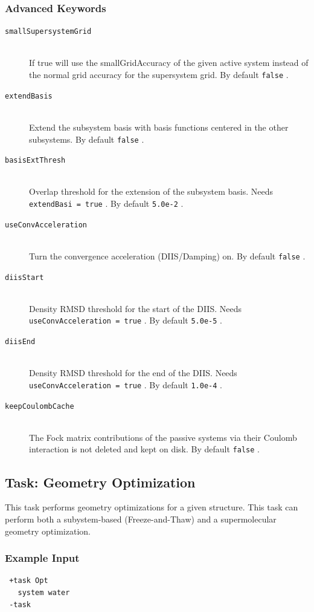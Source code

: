 \documentclass[bibliography=totocnumbered,a4paper,10pt,oneside]{scrbook}
\newcommand{\ttt}[1]{%
  \begingroup\setlength{\fboxsep}{1pt}%
  \colorbox{serenity-green!30}{\texttt{\hspace*{2pt}\vphantom{(g}#1\hspace*{2pt}}}%
  \endgroup
}
\begin{document}
\subsubsection{Advanced Keywords}
\begin{description}
	\item [\texttt{smallSupersystemGrid}]\hfill \\
	If true will use the smallGridAccuracy of the given active system instead of the normal grid accuracy for the supersystem grid. By default \ttt{false}.
	\item [\texttt{extendBasis}]\hfill \\
	Extend the subsystem basis with basis functions centered in the other subsystems. By default \ttt{false}.
	\item [\texttt{basisExtThresh}]\hfill \\
	Overlap threshold for the extension of the subsystem basis. Needs \ttt{extendBasi = true}. By default \ttt{5.0e-2}.
	\item [\texttt{useConvAcceleration}]\hfill \\
	Turn the convergence acceleration (DIIS/Damping) on. By default \ttt{false}.
	\item [\texttt{diisStart}]\hfill \\
	Density RMSD threshold for the start of the DIIS. Needs \ttt{useConvAcceleration = true}. By default \ttt{5.0e-5}.
	\item [\texttt{diisEnd}]\hfill \\
	Density RMSD threshold for the end of the DIIS. Needs \ttt{useConvAcceleration = true}. By default \ttt{1.0e-4}.
	\item [\texttt{keepCoulombCache}]\hfill \\
	The Fock matrix contributions of the passive systems via their Coulomb interaction is not deleted and kept on disk. By default \ttt{false}.
\end{description}

\subsection{Task: Geometry Optimization}
This task performs geometry optimizations for a given structure. This task can perform both a subystem-based (Freeze-and-Thaw) and a supermolecular geometry optimization.
\subsubsection{Example Input}
\begin{lstlisting}
 +task Opt
   system water
 -task
\end{lstlisting}
\end{document}
